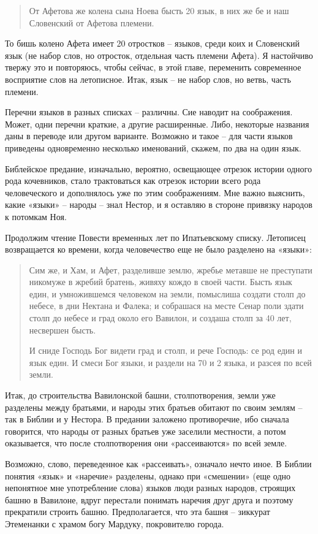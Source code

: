 \begin{quotation}
От Афетова же колена сына Ноева бысть 20 язык, в них же бе и наш Словенский от Афетова племени.
\end{quotation}

То бишь колено Афета имеет 20 отростков – языков, среди коих и Словенский язык (не набор слов, но отросток, отдельная часть племени Афета). Я настойчиво твержу это и повторяюсь, чтобы сейчас, в этой главе, переменить современное восприятие слов на летописное. Итак, язык – не набор слов, но ветвь, часть племени.

Перечни языков в разных списках – различны. Сие наводит на соображения. Может, одни перечни краткие, а другие расширенные. Либо, некоторые названия даны в переводе или другом варианте. Возможно и такое – для части языков приведены одновременно несколько именований, скажем, по два на один язык.

Библейское предание, изначально, вероятно, освещающее отрезок истории одного рода кочевников, стало трактоваться как отрезок истории всего рода человеческого и дополнялось уже по этим соображениям. Мне важно выяснить, какие «языки» – народы – знал Нестор, и я оставляю в стороне привязку народов к потомкам Ноя.

Продолжим чтение Повести временных лет по Ипатьевскому списку. Летописец возвращается ко времени, когда человечество еще не было разделено на «языки»:

\begin{quotation}
Сим же, и Хам, и Афет, разделивше землю, жребье метавше не преступати никомуже в жребий братень, живяху кождо в своей части. Бысть язык един, и умножившемся человеком на земли, помыслиша создати столп до небесе, в дни Нектана и Фалека; и собрашася на месте Сенар поли здати столп до небесе и град около его Вавилон, и создаша столп за 40 лет, несвершен бысть.

И сниде Господь Бог видети град и столп, и рече Господь: се род един и язык един. И смеси Бог языки, и раздели на 70 и 2 языка, и разсея по всей земли.
\end{quotation}

Итак, до строительства Вавилонской башни, столпотворения, земли уже разделены между братьями, и народы этих братьев обитают по своим землям – так в Библии и у Нестора. В предании заложено противоречие, ибо сначала говорится, что народы от разных братьев уже заселили местности, а потом оказывается, что после столпотворения они «рассеиваются» по всей земле. 

Возможно, слово, переведенное как «рассеивать», означало нечто иное. В Библии понятия «язык» и «наречие» разделены, однако при «смешении» (еще одно непонятное мне употребление слова) языков люди разных народов, строящих башню в Вавилоне, вдруг перестали понимать наречия друг друга и поэтому прекратили строить башню. Предполагается, что эта башня – зиккурат Этеменанки с храмом богу Мардуку, покровителю города.
   
